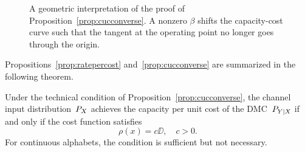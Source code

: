 \begin{figure}[tbph]
  \begin{center}
  \end{center}
  \caption{A geometric interpretation of the proof of
  Proposition~\ref{prop:cucconverse}. A nonzero $\beta$ shifts the capacity-cost
  curve such that the tangent at the operating point no longer goes through the
  origin.}
  \label{fig:cuccongeom}
\end{figure}

Propositions~\ref{prop:ratepercost} and~\ref{prop:cucconverse} are summarized
in the following theorem. 

\begin{theorem}
  \label{thm:cuccond}
  Under the technical condition of Proposition~\ref{prop:cucconverse}, the
  channel input distribution~$P_X$ achieves the capacity per unit cost of the
  DMC~$P_{Y|X}$ if and only if the cost function satisfies
  \begin{equation}
    \label{eq:optcostthm}
    \rho(x) = c \DD, \quad c > 0. 
  \end{equation}
  For continuous alphabets, the condition is sufficient but not necessary.
\end{theorem}


